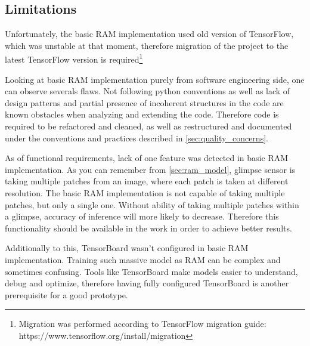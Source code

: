 {\subsection{Limitations}
Unfortunately, the basic RAM implementation used old version of TensorFlow,
which was unstable at that moment, therefore migration of the project
to the latest TensorFlow version is required\footnote{
	Migration was performed according to TensorFlow migration
	guide: https://www.tensorflow.org/install/migration
}

Looking at basic RAM implementation purely from software engineering side,
one can observe severals flaws. Not following python conventions as well
as lack of design patterns and partial presence of incoherent structures in the code
are known obstacles when analyzing and extending the code.
Therefore code is required to be refactored and cleaned,
as well as restructured and documented under the conventions and
practices described in \autoref{sec:quality_concerns}.


As of functional requirements, lack of one feature was detected in basic RAM implementation.
As you can remember from \autoref{sec:ram_model}, glimpse sensor is taking
multiple patches from an image, where each patch is taken at different resolution.
The basic RAM implementation is not capable of taking multiple patches,
but only a single one. Without ability of taking multiple patches within a glimpse,
accuracy of inference will more likely to decrease. Therefore this functionality
should be available in the work in order to achieve better results.

Additionally to this, TensorBoard wasn't configured in basic RAM implementation.
Training such massive model as RAM can be complex and sometimes confusing.
Tools like TensorBoard make models easier to understand, debug
and optimize, therefore having fully configured TensorBoard is another
prerequisite for a good prototype.








}
